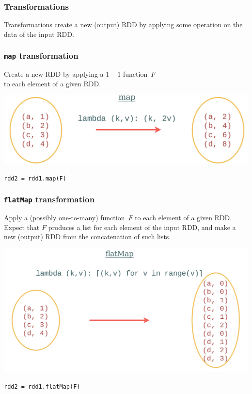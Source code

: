 \documentclass[english,serif,mathserif]{beamer}
\begin{document}
\begin{frame}
  \frametitle{Transformations}
  \begin{center}
    {Transformations} create a new (output) RDD by applying some
    operation on the data of the input RDD.
  \end{center}
\end{frame}


\begin{frame}
  \frametitle{\texttt{map} transformation}

  \begin{center}
    Create a new RDD by applying a $1-1$ function~$F$ \\
    to each element of a given RDD.

    \+
    \includegraphics{fig/map-example.png}

    \+
    \texttt{rdd2 = rdd1.map(F)}
\end{center}
\end{frame}


\begin{frame}
  \frametitle{\texttt{flatMap} transformation}

  \begin{center}
    Apply a (possibly one-to-many) function~$F$
    to each element of a given RDD.  Expect that $F$ produces a list for each
    element of the input RDD, and make a new (output) RDD from the concatenation
    of such lists.

    \+
    \includegraphics[scale=0.8]{fig/flatMap-example.png}

    \texttt{rdd2 = rdd1.flatMap(F)}
\end{center}
\end{frame}
\end{document}
